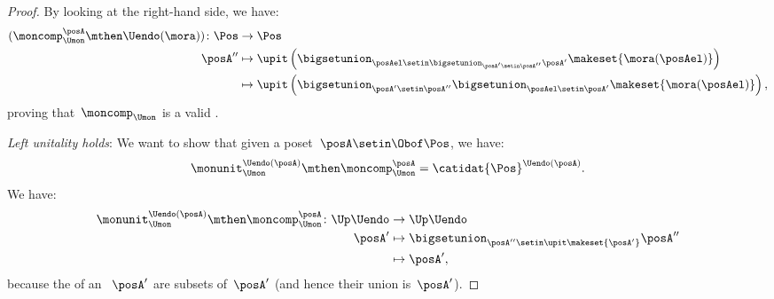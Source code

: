 \begin{proof}
    By looking at the right-hand side, we have:
    \begin{equation}
        \begin{aligned}
            (\moncomp_{\Umon}^\posA \mthen \Uendo(\mora))
            \colon \Pos & \to \Pos \\
            \posA''     & \mapsto \upit \left( \bigsetunion_{\posAel \setin \bigsetunion_{\posA'\setin \posA''}\posA'} \makeset{ \mora(\posAel)}\right) \\
                        & \mapsto \upit \left( \bigsetunion_{\posA'\setin \posA''}\bigsetunion_{\posAel \setin \posA'}\makeset{\mora(\posAel)}\right),
        \end{aligned}
    \end{equation}
    proving that~$\moncomp_{\Umon}$ is a valid .

    \emph{Left unitality holds}: We want to show that given a poset~$\posA\setin \Obof\Pos$, we have:
    \begin{equation}
        \monunit_{\Umon}^{\Uendo(\posA)}\mthen \moncomp_{\Umon}^{\posA}=\catidat{\Pos}^{\Uendo(\posA)}.
    \end{equation}
    We have:
    \begin{equation}
        \begin{aligned}
            \monunit_{\Umon}^{\Uendo(\posA)}\mthen \moncomp_{\Umon}^{\posA}\colon \Up \Uendo & \to \Up \Uendo \\
            \posA'                                                                           & \mapsto \bigsetunion_{\posA''\setin \upit \makeset{ \posA'}} \posA'' \\
                                                                                             & \mapsto \posA',
        \end{aligned}
    \end{equation}
    because the  of an ~$\posA'$ are subsets of~$\posA'$ (and hence their union is~$\posA'$).


\end{proof}

